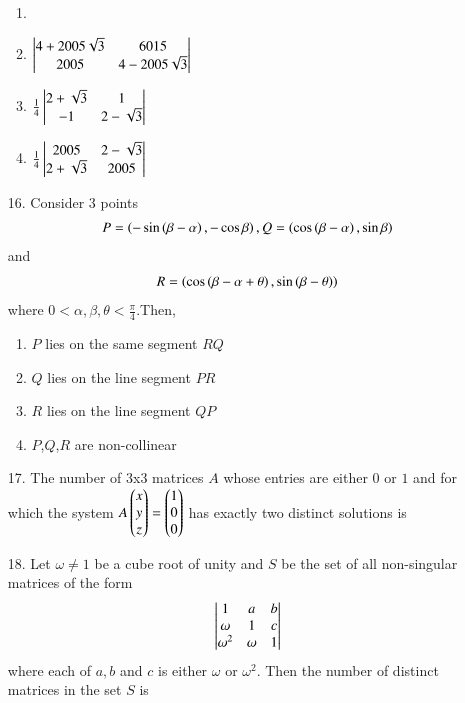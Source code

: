 \documentclass[journal,12pt,twocolumn]{IEEEtran}
\theoremstyle{remark}
\begin{document}
\begin{enumerate}
			\begin{enumerate}
				\item {}
			\item $\begin{vmatrix} 4 + 2005\sqrt{3} & 6015 \\ 2005 & 4 - 2005\sqrt{3}\end{vmatrix}$
			\item $\frac{1}{4}\begin{vmatrix}2 + \sqrt{3} & 1 \\ -1 & 2 -\sqrt{3}\end{vmatrix}$
			\item $\frac{1}{4}\begin{vmatrix}2005 & 2 - \sqrt{3} \\ 2 + \sqrt{3} & 2005\end{vmatrix}$
			\end{enumerate}		
		\item[16.] Consider 3 points 
			\begin{align*}
				P=\left(-\sin \left(\beta - \alpha\right), - \cos\beta\right), Q = \left(\cos \left(\beta - \alpha\right), \sin\beta\right)
				\end{align*} and 
				\begin{align*} R = \left(\cos \left(\beta - \alpha + \theta\right), \sin\left(\beta - \theta\right)\right) \end{align*} where $0<\alpha,\beta,\theta<\frac{\pi}{4}.$Then, \hfill{}
			\begin{enumerate}
				\item $P$ lies on the same segment $RQ$
				\item $Q$ lies on the line segment $PR$
				\item $R$ lies on the line segment $QP$
				\item $P$,$Q$,$R$ are non-collinear
			\end{enumerate}
	\item[17.] The number of 3x3 matrices $A$ whose entries are either $0$ or $1$ and for which the system $A\begin{pmatrix}x\\y\\z\end{pmatrix}=\begin{pmatrix}1\\0\\0\end{pmatrix}$ has exactly two distinct solutions is \hfill{}

		\begin{enumerate}
		\end{enumerate}
	\item[18.] Let $\omega \neq 1$ be a cube root of unity and $S$ be the set of all non-singular matrices of the form 
		\begin{align*}
			\begin{vmatrix}
				1 & a & b \\
				\omega & 1 & c\\
				\omega^2 & \omega & 1
			\end{vmatrix}
		\end{align*} where each of $a,b$ and $c$ is either $\omega$ or $\omega^2$. Then the number of distinct matrices in the set $S$ is
		\hfill{}
			

\end{enumerate}
\end{document}
